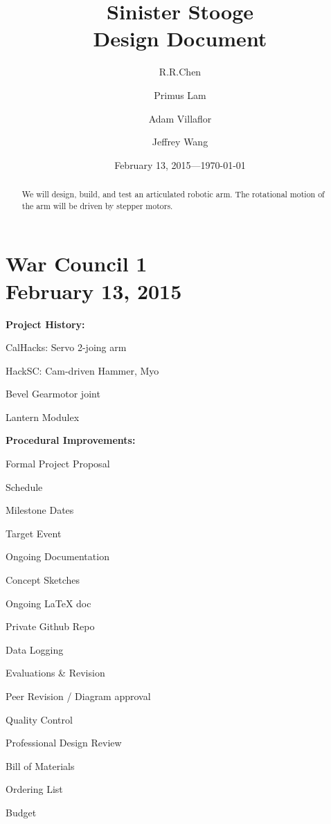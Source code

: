 \documentclass[11pt]{article}
\title{Sinister Stooge\\Design Document}
\author{R.R.Chen \and Primus Lam \and Adam Villaflor \and Jeffrey Wang
}
\date{February 13, 2015---\today}
\begin{document}
\maketitle

\begin{abstract}
\noindent We will design, build, and test an articulated robotic arm. The rotational motion of the arm will be driven by stepper motors.
\end{abstract}

\newpage


\section{War Council 1 \\ February 13, 2015}

\noindent \textbf{Project History:}
\begin{compactitem}
	\item CalHacks: Servo 2-joing arm
	\item HackSC: Cam-driven Hammer, Myo
	\item Bevel Gearmotor joint
	\item Lantern Modulex
\end{compactitem}

\noindent \textbf{Procedural Improvements:}
\begin{compactitem}
	\item Formal Project Proposal
		\begin{compactitem}
		\item Schedule
		\item Milestone Dates
		\item Target Event
		\end{compactitem}
	\item Ongoing Documentation
		\begin{compactitem}
		\item Concept Sketches
		\item Ongoing LaTeX doc
		\item Private Github Repo
		\item Data Logging
		\end{compactitem}
	\item Evaluations \& Revision
		\begin{compactitem}
		\item Peer Revision / Diagram approval
		\item Quality Control
		\item Professional Design Review
		\end{compactitem}
	\item Bill of Materials
		\begin{compactitem}
		\item Ordering List
		\item Budget
		\end{compactitem}
\end{compactitem}
\end{document}
